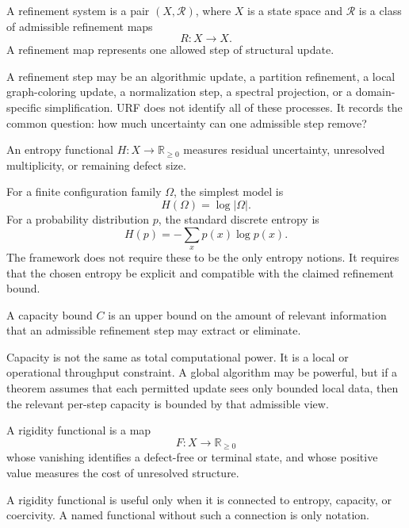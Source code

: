 \begin{definition}
A refinement system is a pair \((X,\mathcal R)\), where \(X\) is a state space
and \(\mathcal R\) is a class of admissible refinement maps
\[
R:X\to X.
\]
A refinement map represents one allowed step of structural update.
\end{definition}

A refinement step may be an algorithmic update, a partition refinement, a
local graph-coloring update, a normalization step, a spectral projection, or a
domain-specific simplification. URF does not identify all of these processes.
It records the common question: how much uncertainty can one admissible step
remove?

\begin{definition}[Entropy]
An entropy functional \(H:X\to \mathbb R_{\ge 0}\) measures residual
uncertainty, unresolved multiplicity, or remaining defect size.
\end{definition}

For a finite configuration family \(\Omega\), the simplest model is
\[
H(\Omega)=\log |\Omega|.
\]
For a probability distribution \(p\), the standard discrete entropy is
\[
H(p)=-\sum_x p(x)\log p(x).
\]
The framework does not require these to be the only entropy notions. It
requires that the chosen entropy be explicit and compatible with the claimed
refinement bound.

\begin{definition}[Capacity]
A capacity bound \(C\) is an upper bound on the amount of relevant information
that an admissible refinement step may extract or eliminate.
\end{definition}

Capacity is not the same as total computational power. It is a local or
operational throughput constraint. A global algorithm may be powerful, but if
a theorem assumes that each permitted update sees only bounded local data,
then the relevant per-step capacity is bounded by that admissible view.

\begin{definition}
A rigidity functional is a map
\[
F:X\to \mathbb R_{\ge 0}
\]
whose vanishing identifies a defect-free or terminal state, and whose positive
value measures the cost of unresolved structure.
\end{definition}

A rigidity functional is useful only when it is connected to entropy,
capacity, or coercivity. A named functional without such a connection is only
notation.

